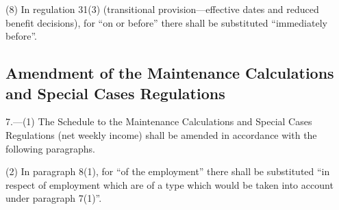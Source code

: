 \documentclass[12pt,a4paper]{article}
\begin{document}
(8) In regulation 31(3) (transitional provision—effective dates and reduced benefit decisions), for “on or before” there shall be substituted “immediately before”.

\subsection[7. Amendment of the Maintenance Calculations and Special Cases Regulations]{\sloppy Amendment of the Maintenance Calculations and Special Cases Regulations}

7.---(1)  The Schedule to the Maintenance Calculations and Special Cases Regulations (net weekly income) shall be amended in accordance with the following paragraphs.

(2) In paragraph 8(1), for “of the employment” there shall be substituted “in respect of employment which are of a type which would be taken into account under paragraph 7(1)”.
\end{document}
